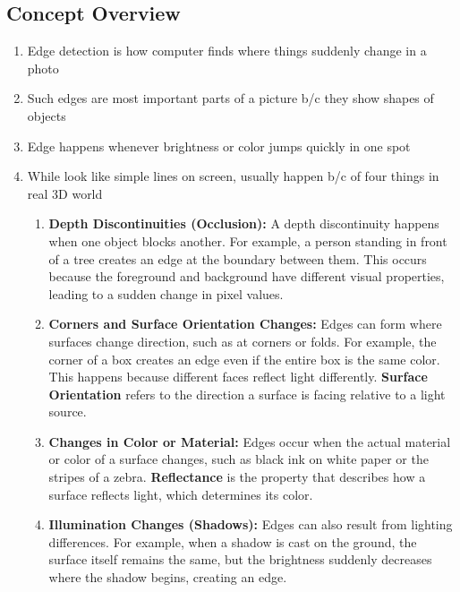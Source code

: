 \documentclass[12pt]{article}
\begin{document}
\subsection{Concept Overview}
\begin{enumerate}
    \item Edge detection is how computer finds where things suddenly change in a photo
    \item Such edges are most important parts of a picture b/c they show shapes of objects
    \item Edge happens whenever brightness or color jumps quickly in one spot
    \item While look like simple lines on screen, usually happen b/c of four things in real 3D world
          \begin{enumerate}
              \item \textbf{Depth Discontinuities (Occlusion):}
                    A depth discontinuity happens when one object blocks another. For example, a person standing in front of a tree creates an edge at the boundary between them. This occurs because the foreground and background have different visual properties, leading to a sudden change in pixel values.

              \item \textbf{Corners and Surface Orientation Changes:}
                    Edges can form where surfaces change direction, such as at corners or folds. For example, the corner of a box creates an edge even if the entire box is the same color. This happens because different faces reflect light differently.
                    \textbf{Surface Orientation} refers to the direction a surface is facing relative to a light source.

              \item \textbf{Changes in Color or Material:}
                    Edges occur when the actual material or color of a surface changes, such as black ink on white paper or the stripes of a zebra.
                    \textbf{Reflectance} is the property that describes how a surface reflects light, which determines its color.

              \item \textbf{Illumination Changes (Shadows):}
                    Edges can also result from lighting differences. For example, when a shadow is cast on the ground, the surface itself remains the same, but the brightness suddenly decreases where the shadow begins, creating an edge.
          \end{enumerate}
\end{enumerate}
\end{document}
